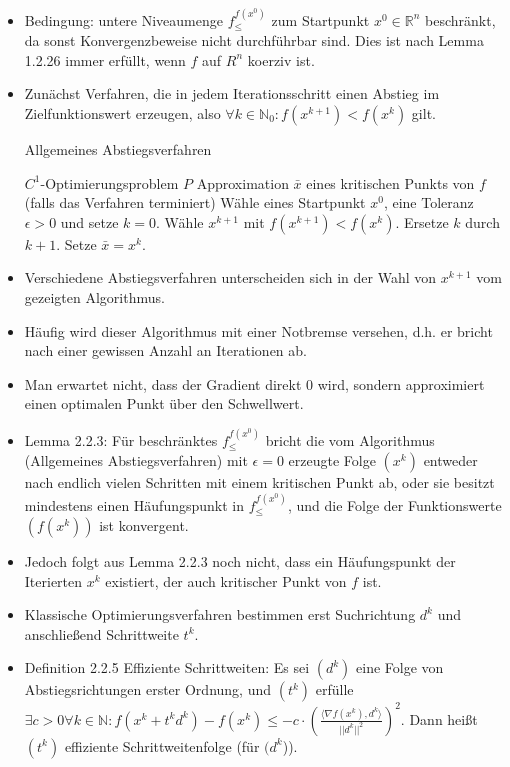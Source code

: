 \documentclass[paper=a4, fontsize=11pt]{scrartcl} %
\numberwithin{equation}{section} %
\numberwithin{figure}{section} %
\numberwithin{table}{section} %
\begin{document}
\begin{itemize}
\item Bedingung: untere Niveaumenge $f^{f(x^0)}_{\le}$ zum Startpunkt $x^0 \in \mathbb{R}^n$ beschränkt, da sonst Konvergenzbeweise nicht durchführbar sind. Dies ist nach Lemma 1.2.26 immer erfüllt, wenn $f$ auf $R^n$ koerziv ist.
\item Zunächst Verfahren, die in jedem Iterationsschritt einen Abstieg im Zielfunktionswert erzeugen, also $\forall k \in \mathbb{N}_0: f(x^{k+1}) < f(x^k)$ gilt.
\begin{algorithm}
\caption{Allgemeines Abstiegsverfahren}
\begin{algorithmic}[1]
  \Require $C^1$-Optimierungsproblem $P$
  \Ensure Approximation $\bar{x}$ eines kritischen Punkts von $f$ (falls das Verfahren terminiert)
  \State Wähle eines Startpunkt $x^0$, eine Toleranz $\epsilon > 0$ und setze $k = 0$.
  \State Wähle $x^{k+1}$ mit $f(x^{k+1}) < f(x^k)$.
  \State Ersetze $k$ durch $k+1$.
  \EndWhile
  \State Setze $\bar{x} = x^k$.
\end{algorithmic}
\end{algorithm}
\item Verschiedene Abstiegsverfahren unterscheiden sich in der Wahl von $x^{k+1}$ vom gezeigten Algorithmus.
\item Häufig wird dieser Algorithmus mit einer Notbremse versehen, d.h. er bricht nach einer gewissen Anzahl an Iterationen ab.
\item Man erwartet nicht, dass der Gradient direkt 0 wird, sondern approximiert einen optimalen Punkt über den Schwellwert.
\item Lemma 2.2.3: Für beschränktes $f^{f(x^0)}_\le$ bricht die vom Algorithmus (Allgemeines Abstiegsverfahren) mit $\epsilon = 0$ erzeugte Folge $(x^k)$ entweder nach endlich vielen Schritten mit einem kritischen Punkt ab, oder sie besitzt mindestens einen Häufungspunkt in $f^{f(x^0)}_\le$, und die Folge der Funktionswerte $(f(x^k))$ ist konvergent.
\item Jedoch folgt aus Lemma 2.2.3 noch nicht, dass ein Häufungspunkt der Iterierten $x^k$ existiert, der auch kritischer Punkt von $f$ ist.
\item Klassische Optimierungsverfahren bestimmen erst Suchrichtung $d^k$ und anschließend Schrittweite $t^k$.
\item Definition 2.2.5 Effiziente Schrittweiten: Es sei $(d^k)$ eine Folge von Abstiegsrichtungen erster Ordnung, und $(t^k)$ erfülle $\exists c > 0 \forall k \in \mathbb{N}: f(x^k+t^kd^k) - f(x^k) \le -c \cdot (\frac{\langle \nabla f(x^k), d^k \rangle}{||d^k||^2})^2$. Dann heißt $(t^k)$ effiziente Schrittweitenfolge (für $(d^k$)).

\end{itemize}
\end{document}
